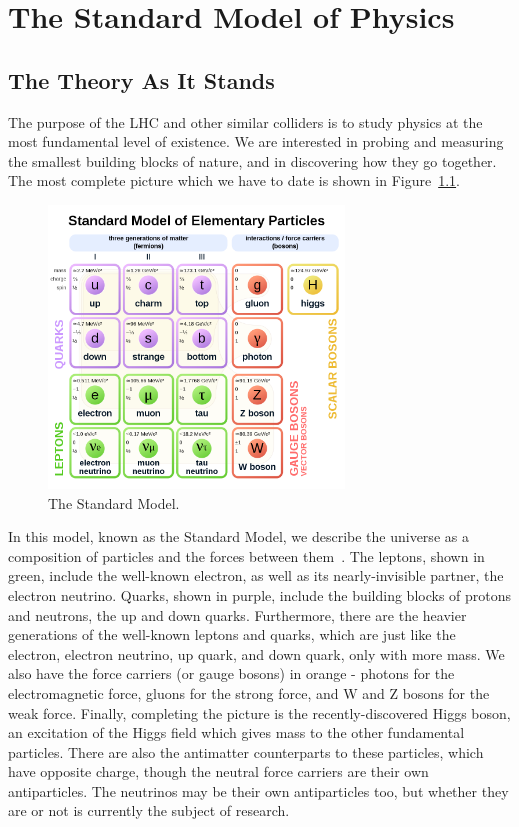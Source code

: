 \chapter{The Standard Model of Physics}\label{chap:SM}

\section{The Theory As It Stands}

The purpose of the LHC and other similar colliders is to study physics at the most fundamental level of existence. We are interested in probing and measuring the smallest building blocks of nature, and in discovering how they go together. The most complete picture which we have to date is shown in Figure~\ref{fig:standard_model}.

\begin{figure}[htbp]
    \centering
    \includegraphics[width=0.7\textwidth]{Images/standard_model.png}
    \caption{The Standard Model.}
    \label{fig:standard_model}
\end{figure}

In this model, known as the Standard Model, we describe the universe as a composition of particles and the forces between them~\cite{Griffiths}. The leptons, shown in green, include the well-known electron, as well as its nearly-invisible partner, the electron neutrino. Quarks, shown in purple, include the building blocks of protons and neutrons, the up and down quarks. Furthermore, there are the heavier generations of the well-known leptons and quarks, which are just like the electron, electron neutrino, up quark, and down quark, only with more mass. We also have the force carriers (or gauge bosons) in orange - photons for the electromagnetic force, gluons for the strong force, and W and Z bosons for the weak force. Finally, completing the picture is the recently-discovered Higgs boson, an excitation of the Higgs field which gives mass to the other fundamental particles. There are also the antimatter counterparts to these particles, which have opposite charge, though the neutral force carriers are their own antiparticles. The neutrinos may be their own antiparticles too, but whether they are or not is currently the subject of research.

